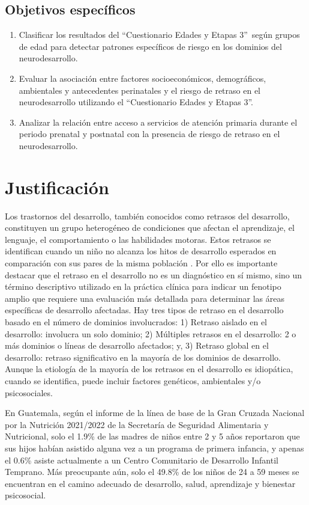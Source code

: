 \documentclass[11pt,letterpaper]{report}
\newcommand{\asq}{“Cuestionario Edades y Etapas 3”}
\begin{document}
\section{Objetivos específicos}
	\begin{enumerate}
		\item Clasificar los resultados del \asq\ según grupos de edad para
		detectar patrones específicos de riesgo en los dominios del
		neurodesarrollo.
		
		\item Evaluar la asociación entre factores socioeconómicos,
		demográficos, ambientales y antecedentes perinatales y el riesgo de
		retraso en el neurodesarrollo utilizando el \asq.
		
		\item Analizar la relación entre acceso a servicios de atención
		primaria durante el periodo prenatal y postnatal con la presencia de
		riesgo de retraso en el neurodesarrollo.
	\end{enumerate}	

	\chapter{Justificación}
Los trastornos del desarrollo, también conocidos como retrasos del desarrollo,
constituyen un grupo heterogéneo de condiciones que afectan el aprendizaje, el
lenguaje, el comportamiento o las habilidades motoras.
\cite{cdcDevelopmentalDisability} Estos retrasos se identifican cuando un niño
no alcanza los hitos de desarrollo esperados en comparación con sus pares de la
misma población \cite{DevelopmentalSurveillance}. Por ello es importante
destacar que el retraso en el desarrollo no es un diagnóstico en sí mismo, sino
un término descriptivo utilizado en la práctica clínica para indicar un
fenotipo amplio que requiere una evaluación más detallada para determinar las
áreas específicas de desarrollo afectadas. Hay tres tipos de retraso en el
desarrollo basado en el número de dominios involucrados: 1) Retraso aislado en
el desarrollo: involucra un solo dominio; 2) Múltiples retrasos en el
desarrollo: 2 o más dominios o líneas de desarrollo afectados; y, 3) Retraso
global en el desarrollo: retraso significativo en la mayoría de los dominios de
desarrollo. \cite{Bellman2013} Aunque la etiología de la mayoría de los
retrasos en el desarrollo es idiopática, cuando se identifica, puede incluir
factores genéticos, ambientales y/o psicosociales. \cite{DevelopmentalDelay}

En Guatemala, según el informe de la línea de base de la Gran Cruzada Nacional
por la Nutrición 2021/2022 de la Secretaría de Seguridad Alimentaria y
Nutricional, solo el 1.9\% de las madres de niños entre 2 y 5 años reportaron
que sus hijos habían asistido alguna vez a un programa de primera infancia, y
apenas el 0.6\% asiste actualmente a un Centro Comunitario de Desarrollo
Infantil Temprano. Más preocupante aún, solo el 49.8\% de los niños de 24 a 59
meses se encuentran en el camino adecuado de desarrollo, salud, aprendizaje y
bienestar psicosocial. \cite{SESAN2022}
\end{document}

